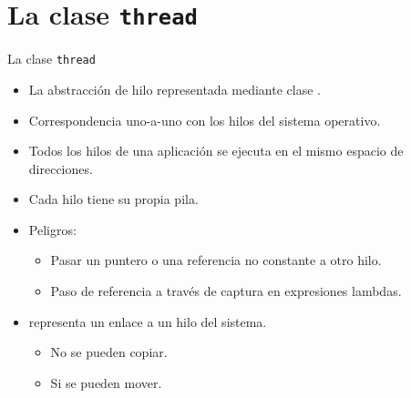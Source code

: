 \section{La clase \texttt{thread}}

\begin{frame}[t]{La clase \texttt{thread}}
\begin{itemize}
  \item La abstracción de hilo representada mediante clase .
  \item Correspondencia uno-a-uno con los hilos del sistema operativo.
  \item Todos los hilos de una aplicación se ejecuta en el mismo espacio de direcciones.
  \item Cada hilo tiene su propia pila.
  \item Peligros:
    \begin{itemize}
      \item Pasar un puntero o una referencia no constante a otro hilo.
      \item Paso de referencia a través de captura en expresiones lambdas.
    \end{itemize}
  \item {} representa un enlace a un hilo del sistema.
    \begin{itemize}
      \item No se pueden copiar.
      \item Si se pueden mover.
    \end{itemize}
\end{itemize}
\end{frame}
